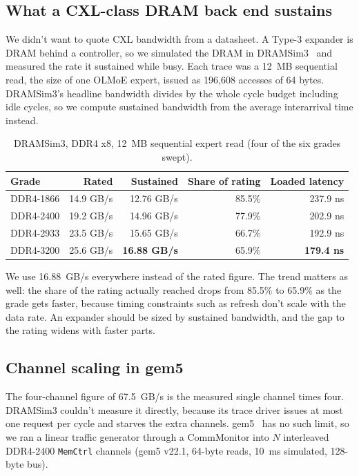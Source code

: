 \documentclass[10pt,a4paper]{article}
\begin{document}
\subsection{What a CXL-class DRAM back end sustains}

We didn't want to quote CXL bandwidth from a datasheet. A Type-3 expander is DRAM
behind a controller, so we simulated the DRAM in DRAMSim3~\cite{dramsim3} and
measured the rate it sustained while busy. Each trace was a 12~MB sequential read,
the size of one OLMoE expert, issued as 196{,}608 accesses of 64 bytes.
DRAMSim3's headline bandwidth divides by the whole cycle budget including idle
cycles, so we compute sustained bandwidth from the average interarrival time
instead.

\begin{table}[htbp]
\centering\small
\caption{DRAMSim3, DDR4 x8, 12~MB sequential expert read (four of the six grades
swept).}
\label{tab:dram}
\begin{tabular}{lrrrr}
\toprule
Grade & Rated & Sustained & Share of rating & Loaded latency \\
\midrule
DDR4-1866 & 14.9 GB/s & 12.76 GB/s & 85.5\% & 237.9 ns \\
DDR4-2400 & 19.2 GB/s & 14.96 GB/s & 77.9\% & 202.9 ns \\
DDR4-2933 & 23.5 GB/s & 15.65 GB/s & 66.7\% & 192.9 ns \\
DDR4-3200 & 25.6 GB/s & \textbf{16.88 GB/s} & 65.9\% & \textbf{179.4 ns} \\
\bottomrule
\end{tabular}
\end{table}

We use 16.88~GB/s everywhere instead of the rated figure. The trend matters as
well: the share of the rating actually reached drops from 85.5\% to 65.9\% as the
grade gets faster, because timing constraints such as refresh don't scale with the
data rate. An expander should be sized by sustained bandwidth, and the gap to the
rating widens with faster parts.

\subsection{Channel scaling in gem5}
\label{sec:channels}

The four-channel figure of 67.5~GB/s is the measured single channel times four.
DRAMSim3 couldn't measure it directly, because its trace driver issues at most one
request per cycle and starves the extra channels. gem5~\cite{gem5} has no such
limit, so we ran a linear traffic generator through a CommMonitor into $N$
interleaved DDR4-2400 \texttt{MemCtrl} channels (gem5 v22.1, 64-byte reads,
10~ms simulated, 128-byte bus).
\end{document}
